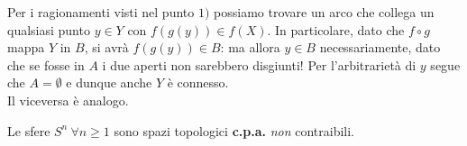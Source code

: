 \begin{demonstration}
\begin{enumerate}[label=\Roman*]
Per i ragionamenti visti nel punto $1)$ possiamo trovare un arco che collega un qualsiasi punto $y\in Y$ con $f\left(g\left(y\right)\right)\in f\left(X\right)$. In particolare, dato che $f\circ g$ mappa $Y$ in $B$, si avrà $f\left(g\left(y\right)\right)\in B$: ma allora $y\in B$ necessariamente, dato che se fosse in $A$ i due aperti non sarebbero disgiunti! Per l'arbitrarietà di $y$ segue che $A=\emptyset$ e dunque anche $Y$ è connesso.\\
Il viceversa è analogo.
\end{enumerate}
\vspace{-6mm}
	\end{demonstration}
\begin{example}
	Le sfere $S^n\ \forall n\geq 1$ sono spazi topologici \textbf{c.p.a.} \textit{non} contraibili.
\end{example}
